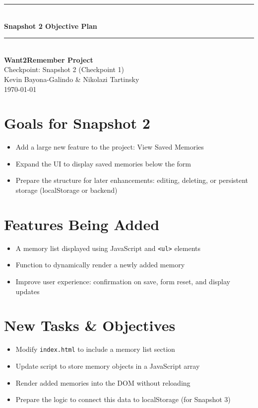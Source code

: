 \documentclass[12pt]{article}
\begin{document}
\begin{titlepage}
    \newcommand{\HRule}{\rule{\linewidth}{0.5mm}} 
    \vspace*{\fill}
    \begin{center}
        \HRule \\[0.5cm]
        {\Huge \bfseries Snapshot 2 Objective Plan \\[0.4cm]}
        \HRule \\[1.5cm]
        {\LARGE \textbf{Want2Remember Project}}\\[0.5cm]
        {\Large Checkpoint: Snapshot 2 (Checkpoint 1)}\\[2cm]
        {\Large Kevin Bayona-Galindo \& Nikolazi Tartinsky}\\[0.5cm]
        {\large \today}
    \end{center}
    \vspace*{\fill}
\end{titlepage}

\section*{Goals for Snapshot 2}
\begin{itemize}
  \item Add a large new feature to the project: View Saved Memories
  \item Expand the UI to display saved memories below the form
  \item Prepare the structure for later enhancements: editing, deleting, or persistent storage (localStorage or backend)
\end{itemize}

\section*{Features Being Added}
\begin{itemize}
  \item A memory list displayed using JavaScript and \texttt{<ul>} elements
  \item Function to dynamically render a newly added memory
  \item Improve user experience: confirmation on save, form reset, and display updates
\end{itemize}

\section*{New Tasks \& Objectives}
\begin{itemize}
  \item Modify \texttt{index.html} to include a memory list section
  \item Update script to store memory objects in a JavaScript array
  \item Render added memories into the DOM without reloading
  \item Prepare the logic to connect this data to localStorage (for Snapshot 3)
\end{itemize}
\end{document}
